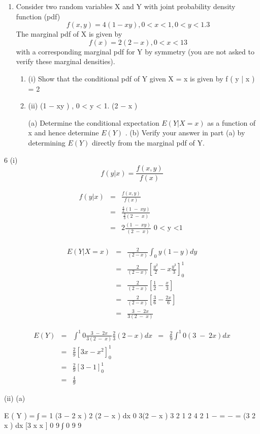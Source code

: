 \documentclass[a4paper,12pt]{article}
\begin{document}
\begin{enumerate}
\item %
Consider two random variables X and Y with joint probability density function (pdf)
\[f ( x , y ) =
4
(1 − xy ) , 0 < x < 1, 0 < y < 1 .
3\]
The marginal pdf of X is given by
\[f ( x ) =
2
(2 − x ) , 0 < x < 1
3\]
with a corresponding marginal pdf for Y by symmetry (you are not asked to verify
these marginal densities).
\begin{enumerate}
    \item (i)
Show that the conditional pdf of Y given X = x is given by
f ( y | x ) = 2
\item (ii)
(1 − xy )
, 0 < y < 1.
(2 − x )

(a) Determine the conditional expectation $E ( Y | X = x )$ as a function of x
and hence determine $E ( Y )$ .
(b) Verify your answer in part (a) by determining $E ( Y )$ directly from the
marginal pdf of Y.
\end{enumerate}
\end{enumerate}

\newpage
6
(i)
\[ f(y|x) = \frac{f(x,y)}{f(x)}\]

\begin{eqnarray*}
 f(y|x) &=& \frac{f(x,y)}{f(x)}  \\
 &=& \frac{  \frac{4}{3} (1\;-\;xy) }{\frac{2}{3} (2\;-\;x)  }  \\
 &=& 2 \frac{(1\;-\;xy)}{(2\;-\;x)} \mbox{ 0 < y <1 }  \\
 \end{eqnarray*}
 
 
 
 \begin{eqnarray*}
 E(Y|X=x) &=& \frac{2}{(2-x)} \int^{}_{0} y(1-y) dy \\
  &=& \frac{2}{(2-x)} \left[  \frac{y^2}{2} - x \frac{y^3}{3}\right]^{1}_{0} \\ 
  &=& \frac{2}{(2-x)} \left[  \frac{1}{2} -  \frac{x}{3}\right] \\ 
  &=& \frac{2}{(2-x)} \left[  \frac{3}{6} -  \frac{2x}{6}\right] \\ 
  &=& \frac{3\;-\;2x}{3(2\;-\;x)}
 \end{eqnarray*}
 
 \begin{eqnarray*}
 E(Y) &=& \int^{1}{0} \frac{3\;-\;2x}{3(2\;-\;x)} \frac{2}{3} (2-x) dx
 &=& \frac{2}{9} \int^{1}{0}  (3 \;-\;2x) dx \\
 &=&  \frac{2}{9}  \left[  3x - x^2 \right]^{1}_{0} \\
&=&  \frac{2}{9}  \left[  3- 1 \right]^{1}_{0} \\ 
&=& \frac{4}{9}
\end{eqnarray*}

(ii)
(a)

E ( Y ) = ∫
=
1 (3 − 2 x )
2
(2 − x ) dx
0 3(2 − x ) 3
2 1
2
4
2 1
−
=
−
=
(3
2
x
)
dx
[3
x
x
]
0
9 ∫ 0
9
9
\end{document}
